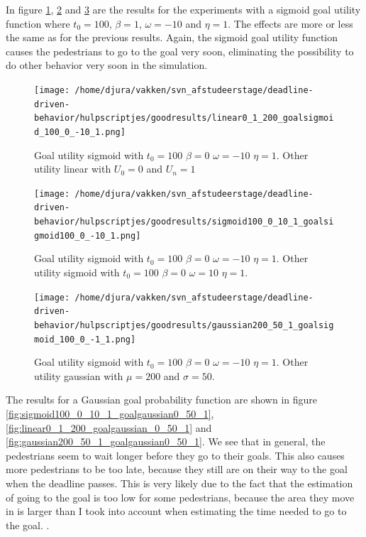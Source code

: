 \documentclass[11pt]{book}
\begin{document}

In figure \ref{fig:linear0_1_200_goalsigmoid_100_0_-10_1}, \ref{fig:sigmoid100_0_10_1_goalsigmoid100_0_-10_1} and \ref{fig:gaussian200_50_1_goalsigmoid_100_0_-10_1} are the results for the experiments with a sigmoid goal utility function where $t_0=100$, $\beta=1$, $\omega=-10$ and $\eta=1$. The effects are more or less the same as for the previous results. Again, the sigmoid goal utility function causes the pedestrians to go to the goal very soon, eliminating the possibility to do other behavior very soon in the simulation.

\begin{figure}
\centering
\texttt{[image: /home/djura/vakken/svn\_afstudeerstage/deadline-driven-behavior/hulpscriptjes/goodresults/linear0\_1\_200\_goalsigmoid\_100\_0\_-10\_1.png]}
\caption{Goal utility sigmoid with $t_0=100$ $\beta=0$ $\omega=-10$ $\eta=1$. Other utility linear with $U_0=0$ and $U_n=1$}
\label{fig:linear0_1_200_goalsigmoid_100_0_-10_1}
\end{figure}


\begin{figure}
\centering
\texttt{[image: /home/djura/vakken/svn\_afstudeerstage/deadline-driven-behavior/hulpscriptjes/goodresults/sigmoid100\_0\_10\_1\_goalsigmoid100\_0\_-10\_1.png]}
\caption{Goal utility sigmoid with $t_0=100$ $\beta=0$ $\omega=-10$ $\eta=1$. Other utility sigmoid with $t_0=100$ $\beta=0$ $\omega=10$ $\eta=1$.}
\label{fig:sigmoid100_0_10_1_goalsigmoid100_0_-10_1}
\end{figure}

\begin{figure}
\centering
\texttt{[image: /home/djura/vakken/svn\_afstudeerstage/deadline-driven-behavior/hulpscriptjes/goodresults/gaussian200\_50\_1\_goalsigmoid\_100\_0\_-1\_1.png]}
\caption{Goal utility sigmoid with $t_0=100$ $\beta=0$ $\omega=-10$ $\eta=1$. Other utility gaussian with $\mu=200$ and $\sigma=50$.}
\label{fig:gaussian200_50_1_goalsigmoid_100_0_-10_1}
\end{figure}

The results for a Gaussian goal probability function are shown in figure \ref{fig:sigmoid100_0_10_1_goalgaussian0_50_1}, \ref{fig:linear0_1_200_goalgaussian_0_50_1} and \ref{fig:gaussian200_50_1_goalgaussian0_50_1}. We see that in general, the pedestrians seem to wait longer before they go to their goals. This also causes more pedestrians to be too late, because they still are on their way to the goal when the deadline passes. This is very likely due to the fact that the estimation of going to the goal is too low for some pedestrians, because the area they move in is larger than I took into account when estimating the time needed to go to the goal. .
\end{document}
